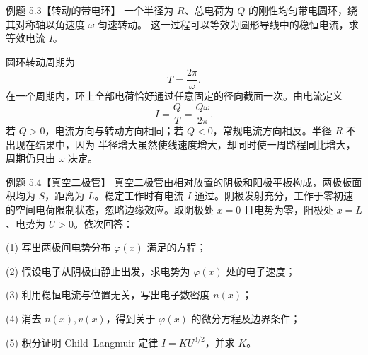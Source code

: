 \begin{origexamplebox}{例题 5.3【转动的带电环】}
一个半径为 $R$、总电荷为 $Q$ 的刚性均匀带电圆环，绕其对称轴以角速度 $\omega$ 匀速转动。
这一过程可以等效为圆形导线中的稳恒电流，求等效电流 $I$。
\emRotatingRingQuestion
{}\label{fig:em-source-thirty-sixth-section-3}
\end{origexamplebox}

\rotatingChargedRingFigure
{}

\begin{xesolution}
圆环转动周期为
\[
  T=\frac{2\pi}{\omega}.
\]
在一个周期内，环上全部电荷恰好通过任意固定的径向截面一次。由电流定义
\[
  \boxed{I=\frac QT=\frac{Q\omega}{2\pi}}.
\]
若 $Q>0$，电流方向与转动方向相同；若 $Q<0$，常规电流方向相反。半径 $R$ 不出现在结果中，因为
半径增大虽然使线速度增大，却同时使一周路程同比增大，周期仍只由 $\omega$ 决定。
\end{xesolution}

\begin{origexamplebox}{例题 5.4【真空二极管】}
真空二极管由相对放置的阴极和阳极平板构成，两极板面积均为 $S$，距离为 $L$。稳定工作时有电流
$I$ 通过。阴极发射充分，工作于零初速的空间电荷限制状态，忽略边缘效应。取阴极处 $x=0$ 且电势为零，阳极处 $x=L$、电势为 $U>0$。依次回答：

(1) 写出两极间电势分布 $\varphi(x)$ 满足的方程；

(2) 假设电子从阴极由静止出发，求电势为 $\varphi(x)$ 处的电子速度；

(3) 利用稳恒电流与位置无关，写出电子数密度 $n(x)$；

(4) 消去 $n(x),v(x)$，得到关于 $\varphi(x)$ 的微分方程及边界条件；

(5) 积分证明 Child--Langmuir 定律 $I=KU^{3/2}$，并求 $K$。
\vacuumDiodeFigure
{}
\end{origexamplebox}




